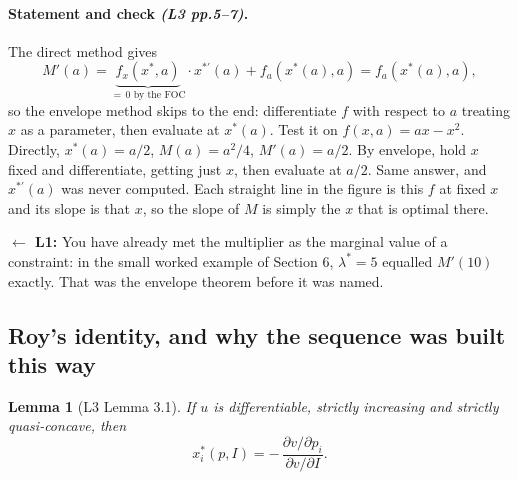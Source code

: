 \documentclass[11pt]{article}
\newtheorem{lemma}{Lemma}
\theoremstyle{definition}
\newcommand{\src}[1]{\textit{\small (#1)}}
\newcommand{\back}[1]{\textbf{\small $\leftarrow$ L1:} \small #1}
\begin{document}
\begin{center}
\end{center}

\paragraph{Statement and check \src{L3 pp.5--7}.} The direct method gives
\[
M'(a)=\underbrace{f_x(x^*,a)}_{=\,0\text{ by the FOC}}\cdot x^{*\prime}(a)+f_a(x^*(a),a)
=f_a(x^*(a),a),
\]
so the envelope method skips to the end: differentiate $f$ with respect to $a$ treating $x$
as a parameter, then evaluate at $x^*(a)$. Test it on $f(x,a)=ax-x^2$. Directly,
$x^*(a)=a/2$, $M(a)=a^2/4$, $M'(a)=a/2$. By envelope, hold $x$ fixed and differentiate,
getting just $x$, then evaluate at $a/2$. Same answer, and $x^{*\prime}(a)$ was never
computed. Each straight line in the figure is this $f$ at fixed $x$ and its slope is that
$x$, so the slope of $M$ is simply the $x$ that is optimal there.

\back{You have already met the multiplier as the marginal value of a constraint: in the
small worked example of Section 6, $\lambda^*=5$ equalled $M'(10)$ exactly. That was the
envelope theorem before it was named.}

\subsection{Roy's identity, and why the sequence was built this way}

\begin{lemma}[L3 Lemma 3.1]
If $u$ is differentiable, strictly increasing and strictly quasi-concave, then
\[
x_i^*(p,I)=-\,\frac{\partial v/\partial p_i}{\partial v/\partial I}.
\]
\end{lemma}
\end{document}
